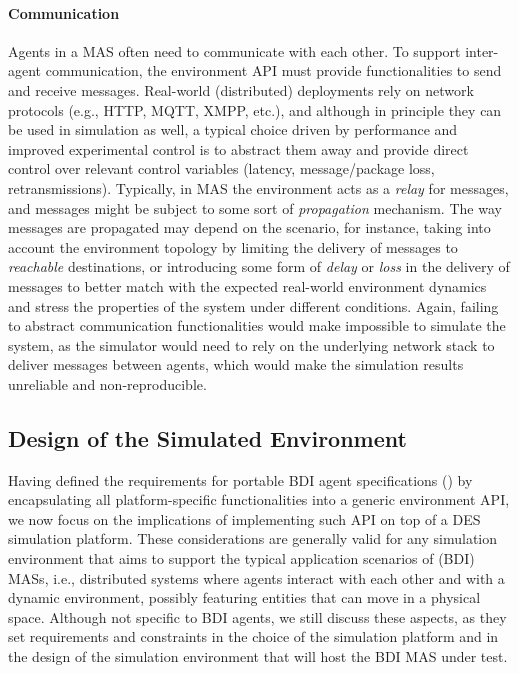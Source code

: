 \paragraph{Communication}
Agents in a \ac{MAS} often need to communicate with each other.
%
To support inter-agent
communication, the environment \ac{API} must provide functionalities to send and receive messages.
%
Real-world (distributed) deployments rely on network protocols
(e.g., HTTP, MQTT, XMPP, etc.),
and although in principle they can be used in simulation as well,
a typical choice driven by performance and improved experimental control
is to abstract them away and provide direct control over relevant control variables
(latency, message/package loss, retransmissions).
%
Typically,
in \ac{MAS}
the environment acts as a \emph{relay} for messages,
and messages might be subject to some sort of \emph{propagation} mechanism.
%
The way messages are propagated may depend on the scenario,
for instance,
taking into account the environment topology by
limiting the delivery of messages to \emph{reachable} destinations,
or
introducing some form of \emph{delay}
or \emph{loss}
in the delivery of messages
to better match with the expected real-world environment dynamics and
stress the properties of the system under different conditions.
%
Again, failing to abstract communication functionalities
would make impossible to simulate the system,
as the simulator would need to rely on the underlying network stack to deliver messages between agents,
which would make the simulation results unreliable and non-reproducible.


\subsection{Design of the Simulated Environment}
\label{ssec:simulation:design-simulated-environment}

Having defined the requirements for portable \ac{BDI} agent specifications ()
by encapsulating all platform-specific functionalities
into a generic environment \ac{API},
we now focus on the implications of implementing such \ac{API}
on top of a \ac{DES} simulation platform.
%
These considerations are generally valid for any simulation environment
that aims to support the typical application scenarios of (\ac{BDI}) \acp{MAS},
i.e., distributed systems where agents interact with each other
and with a dynamic environment, possibly featuring
entities that can move in a physical space.
%
Although not specific to \ac{BDI} agents,
we still discuss these aspects,
as they set requirements and constraints in the choice of the simulation platform
and in the design of the simulation environment
that will host the \ac{BDI} \ac{MAS} under test.

